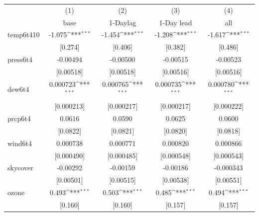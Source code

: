 \documentclass[11pt]{article}
\begin{document}
	\newpage
	\begin{center}
		 \label{tab:title} 
		{
			\def\sym#1{\ifmmode^{#1}\else\(^{#1}\)\fi}
			\begin{tabular}{l*{4}{c}}
				\hline\hline
				&\multicolumn{1}{c}{(1)}&\multicolumn{1}{c}{(2)}&\multicolumn{1}{c}{(3)}&\multicolumn{1}{c}{(4)}\\
				&\multicolumn{1}{c}{base}&\multicolumn{1}{c}{1-Daylag}&\multicolumn{1}{c}{1-Day lead}&\multicolumn{1}{c}{all}\\
				\hline
				temp6t410   &      -1.075\sym{***}&      -1.454\sym{***}&      -1.208\sym{***}&      -1.617\sym{***}\\
				&     [0.274]         &     [0.406]         &     [0.382]         &     [0.486]         \\
				[1em]
				press6t4    &    -0.00494         &    -0.00500         &    -0.00515         &    -0.00523         \\
				&   [0.00518]         &   [0.00518]         &   [0.00516]         &   [0.00516]         \\
				[1em]
				dew6t4      &    0.000723\sym{***}&    0.000765\sym{***}&    0.000735\sym{***}&    0.000780\sym{***}\\
				&  [0.000213]         &  [0.000217]         &  [0.000217]         &  [0.000222]         \\
				[1em]
				prcp6t4     &      0.0616         &      0.0590         &      0.0625         &      0.0600         \\
				&    [0.0822]         &    [0.0821]         &    [0.0820]         &    [0.0818]         \\
				[1em]
				wind6t4     &    0.000738         &    0.000771         &    0.000820         &    0.000866         \\
				&  [0.000490]         &  [0.000485]         &  [0.000548]         &  [0.000543]         \\
				[1em]
				skycover    &    -0.00292         &    -0.00159         &    -0.00186         &   -0.000343         \\
				&   [0.00501]         &   [0.00515]         &   [0.00538]         &   [0.00551]         \\
				[1em]
				ozone       &       0.493\sym{***}&       0.503\sym{***}&       0.485\sym{***}&       0.494\sym{***}\\
				&     [0.160]         &     [0.160]         &     [0.157]         &     [0.157]         \\

\end{tabular}}
\end{center}
\end{document}
